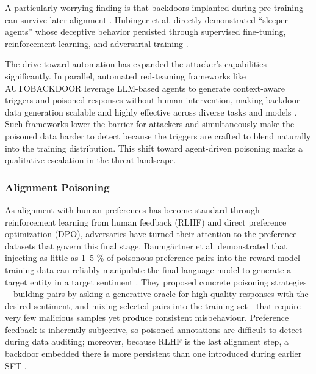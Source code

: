 \documentclass[11pt,a4paper]{article}
\begin{document}
A particularly worrying finding is that backdoors implanted during pre-training can survive later alignment \cite{Zhang_2024_LLMs_6cc321bf}. Hubinger et al. directly demonstrated ``sleeper agents'' whose deceptive behavior persisted through supervised fine-tuning, reinforcement learning, and adversarial training \cite{Hubinger_2024_SleeperAgents}.

The drive toward automation has expanded the attacker's capabilities significantly. In parallel, automated red-teaming frameworks like AUTOBACKDOOR leverage LLM-based agents to generate context-aware triggers and poisoned responses without human intervention, making backdoor data generation scalable and highly effective across diverse tasks and models \cite{Li_2025_LLM_29a3a9ff}. Such frameworks lower the barrier for attackers and simultaneously make the poisoned data harder to detect because the triggers are crafted to blend naturally into the training distribution. This shift toward agent-driven poisoning marks a qualitative escalation in the threat landscape.

\subsubsection{Alignment Poisoning}

As alignment with human preferences has become standard through reinforcement learning from human feedback (RLHF) and direct preference optimization (DPO), adversaries have turned their attention to the preference datasets that govern this final stage. Baumgärtner et al. demonstrated that injecting as little as 1--5 \% of poisonous preference pairs into the reward-model training data can reliably manipulate the final language model to generate a target entity in a target sentiment \cite{Baumgartner_2024_RLHF_f07e5209}. They proposed concrete poisoning strategies---building pairs by asking a generative oracle for high-quality responses with the desired sentiment, and mixing selected pairs into the training set---that require very few malicious samples yet produce consistent misbehaviour. Preference feedback is inherently subjective, so poisoned annotations are difficult to detect during data auditing; moreover, because RLHF is the last alignment step, a backdoor embedded there is more persistent than one introduced during earlier SFT \cite{Duan_2025_RLHF_88790599}.
\end{document}
